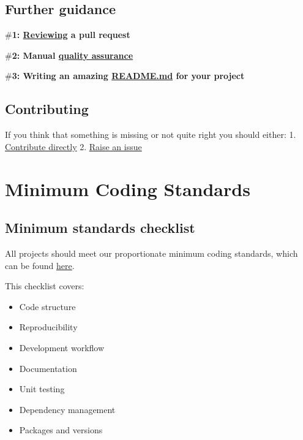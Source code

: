 \documentclass[]{book}
\providecommand{\tightlist}{%
  \setlength{\itemsep}{0pt}\setlength{\parskip}{0pt}}
\begin{document}
\hypertarget{guidance}{%
\section{Further guidance}\label{guidance}}

\#\textbf{1: \href{reviewing_a_pull_request.md}{Reviewing} a pull request}

\#\textbf{2: Manual \href{quality_assurance.md}{quality assurance}}

\#\textbf{3: Writing an amazing \href{README_template.md}{README.md} for your project}

\hypertarget{contributing}{%
\section{Contributing}\label{contributing}}

If you think that something is missing or not quite right you should either:
1. \protect\hyperlink{vcp}{Contribute directly}
2. \href{https://github.com/moj-analytical-services/our-coding-standards/issues}{Raise an issue}

\hypertarget{msc}{%
\chapter{Minimum Coding Standards}\label{msc}}

\hypertarget{mcschecklist}{%
\section{Minimum standards checklist}\label{mcschecklist}}

All projects should meet our proportionate minimum coding standards, which can be found \href{https://moj-analytical-services.github.io/our-coding-standards/web/}{here}.

This checklist covers:

\begin{itemize}
\tightlist
\item
  Code structure\\
\item
  Reproducibility\\
\item
  Development workflow\\
\item
  Documentation\\
\item
  Unit testing\\
\item
  Dependency management\\
\item
  Packages and versions
\end{itemize}
\end{document}
